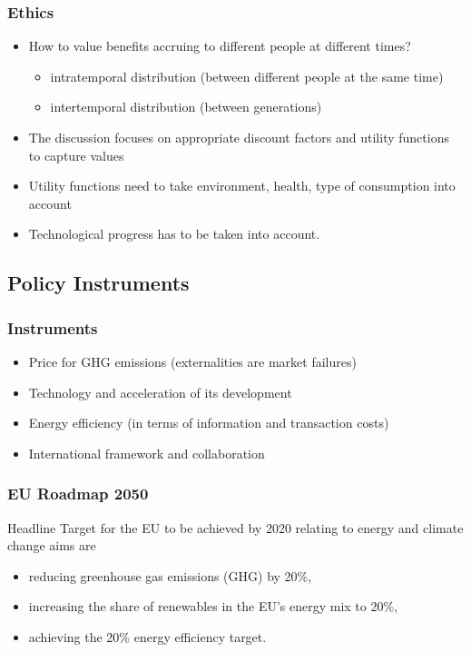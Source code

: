 \begin{frame}
\frametitle{Ethics}
\begin{itemize}
\item<1-> How to value benefits accruing to different people at different times?
\begin{itemize}
\item intratemporal distribution (between different people at the same time)
\item intertemporal distribution (between generations)
\end{itemize}
\item<2-> The discussion focuses on appropriate discount factors and utility functions to capture values
\item<3-> Utility functions need to take environment, health, type of consumption into account
\item<4-> Technological progress has to be taken into account.
\end{itemize}
\end{frame}

\subsection{Policy Instruments}

\begin{frame}
\frametitle{Instruments}
\begin{itemize}
\item<1-> Price for GHG emissions (externalities are market failures)
\item<2-> Technology and acceleration of its development
\item<3-> Energy efficiency (in terms of information and transaction costs)
\item<4-> International framework and collaboration
\end{itemize}
\end{frame}


\begin{frame}
 \frametitle{EU Roadmap 2050}
Headline Target for the EU to be achieved by 2020 relating to energy and climate change aims are
\begin{itemize}
\item<1-> reducing greenhouse gas emissions (GHG) by 20\%,
\item<2-> increasing the share of renewables in the EU's energy mix to 20\%,
\item<3-> achieving the 20\% energy efficiency target.
\end{itemize}
\end{frame} %


